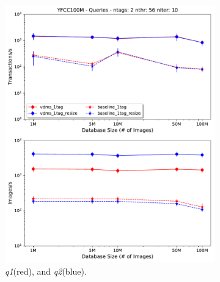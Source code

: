 \begin{figure}[ht!]
\begin{subfigure}{.5\linewidth}
  \centering
  \includegraphics[width=\columnwidth]{figures/queries_throughput_56_q1_q2}
  \caption{\textit{q1}(red), and \textit{q2}(blue).}
  \label{fig:q1_q2}
\end{subfigure}
\begin{subfigure}{.5\linewidth}
  \centering

\end{subfigure}
\end{figure}

